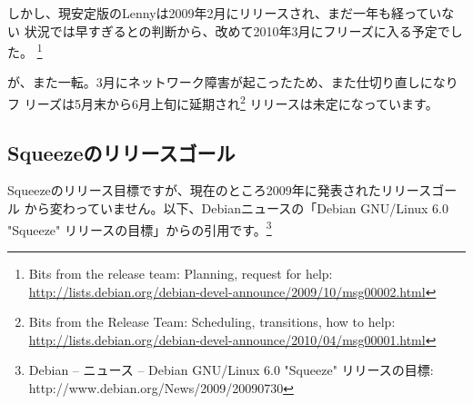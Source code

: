 \documentclass[mingoth,a4paper]{jsarticle}
\begin{document}
しかし、現安定版のLennyは2009年2月にリリースされ、まだ一年も経っていない
状況では早すぎるとの判断から、改めて2010年3月にフリーズに入る予定でした。
\footnote{Bits from the release team: Planning, request for help:
\url{http://lists.debian.org/debian-devel-announce/2009/10/msg00002.html}}

が、また一転。3月にネットワーク障害が起こったため、また仕切り直しになりフ
リーズは5月末から6月上旬に延期され\footnote{Bits from the Release Team:
Scheduling, transitions, how to help:
\url{http://lists.debian.org/debian-devel-announce/2010/04/msg00001.html}}
リリースは未定になっています。

\subsection{Squeezeのリリースゴール}
Squeezeのリリース目標ですが、現在のところ2009年に発表されたリリースゴール
から変わっていません。以下、Debianニュースの「Debian GNU/Linux 6.0
"Squeeze" リリースの目標」からの引用です。\footnote{Debian -- ニュース
-- Debian GNU/Linux 6.0 "Squeeze" リリースの目標:
http://www.debian.org/News/2009/20090730}
\end{document}
